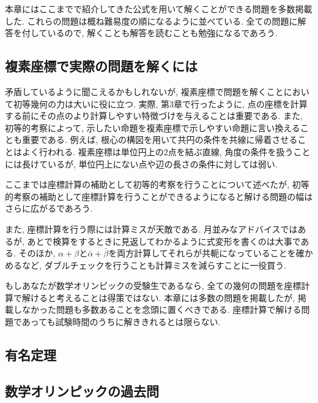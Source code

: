 本章にはここまでで紹介してきた公式を用いて解くことができる問題を多数掲載した.
これらの問題は概ね難易度の順になるように並べている.
全ての問題に解答を付しているので, 解くことも解答を読むことも勉強になるであろう.
\subsection{複素座標で実際の問題を解くには}
矛盾しているように聞こえるかもしれないが, 複素座標で問題を解くことにおいて初等幾何の力は大いに役に立つ.
実際, 第3章で行ったように, 点の座標を計算する前にその点のより計算しやすい特徴づけを与えることは重要である.
また, 初等的考察によって, 示したい命題を複素座標で示しやすい命題に言い換えることも重要である.
例えば, 根心の構図を用いて共円の条件を共線に帰着させることはよく行われる.
複素座標は単位円上の$2$点を結ぶ直線, 角度の条件を扱うことには長けているが, 単位円上にない点や辺の長さの条件に対しては弱い.

ここまでは座標計算の補助として初等的考察を行うことについて述べたが, 初等的考察の補助として座標計算を行うことができるようになると解ける問題の幅はさらに広がるであろう.

また, 座標計算を行う際には計算ミスが天敵である.
月並みなアドバイスではあるが, あとで検算をするときに見返してわかるように式変形を書くのは大事である.
そのほか, $\alpha+\beta$と$\bar\alpha+\bar\beta$を両方計算してそれらが共軛になっていることを確かめるなど, ダブルチェックを行うことも計算ミスを減らすことに一役買う.

もしあなたが数学オリンピックの受験生であるなら, 全ての幾何の問題を座標計算で解けると考えることは得策ではない.
本章には多数の問題を掲載したが, 掲載しなかった問題も多数あることを念頭に置くべきである.
座標計算で解ける問題であっても試験時間のうちに解ききれるとは限らない.
%
\newcommand{\plabel}[1]{\label{#1}}
\showsolutionsfalse
\subsection{有名定理}

\subsection{数学オリンピックの過去問}
